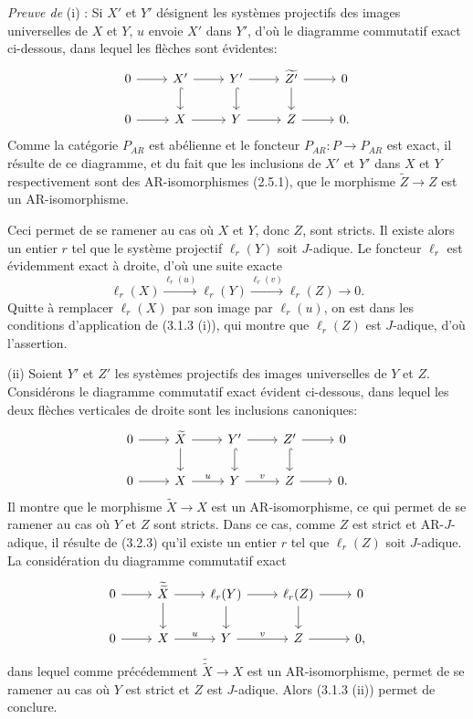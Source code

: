 \emph{Preuve de} (i) : Si $X'$ et $Y'$ désignent les systèmes projectifs des images universelles de $X$ et $Y$, $u$ envoie $X'$ dans $Y'$, d'où le diagramme commutatif exact ci-dessous, dans lequel les flèches sont évidentes:
\[
\begin{tikzcd}
0 \arrow[r] & X' \arrow[r] \arrow[d,hook] & Y' \arrow[r] \arrow[d,hook] & \widetilde{Z'} \arrow[r] \arrow[d] & 0\\
0 \arrow[r] & X \arrow[r] & Y \arrow[r] & Z \arrow[r] & 0 .
\end{tikzcd}
\]
Comme la catégorie $P_{AR}$ est abélienne et le foncteur 
$P_{AR}\colon P\to P_{AR}$ est
exact, il résulte de ce diagramme, et du fait que les inclusions de $X'$ et $Y'$ dans $X$ et $Y$ respectivement sont des AR-isomorphismes (2.5.1), que le morphisme $\widetilde Z\to Z$ est un AR-isomorphisme.

Ceci permet de se ramener au cas où $X$ et $Y$, donc $Z$, sont stricts. Il existe alors un entier $r$ tel que le système projectif $\ell_r(Y)$ soit $J$-adique. Le foncteur $\ell_r$ est évidemment exact à droite, d'où une suite exacte
\[
\ell_r(X)\stackrel{\ell_r(u)}{\longrightarrow}\ell_r(Y)\stackrel{\ell_r(v)}{\longrightarrow}\ell_r(Z)\longrightarrow0.
\]
Quitte à remplacer $\ell_r(X)$ par son image par $\ell_r(u)$, on est dans les conditions d'application de (3.1.3 (i)), qui montre que $\ell_r(Z)$ est $J$-adique, d'où l'assertion.

(ii) Soient $Y'$ et $Z'$ les systèmes projectifs des images universelles de $Y$ et $Z$. Considérons le diagramme commutatif exact évident ci-dessous, dans lequel les deux flèches verticales de droite sont les inclusions canoniques:
\[
\begin{tikzcd}
0 \arrow[r] & \widetilde X \arrow[r] \arrow[d] & Y' \arrow[r] \arrow[d,hook] & Z' \arrow[r] \arrow[d,hook] & 0\\
0 \arrow[r] & X \arrow[r,"u"] & Y \arrow[r,"v"] & Z \arrow[r] & 0 .
\end{tikzcd}
\]
Il montre que le morphisme $\widetilde X\to X$ est un AR-isomorphisme, ce qui permet de se ramener au cas où $Y$ et $Z$ sont stricts. Dans ce cas, comme $Z$ est strict et AR-$J$-adique, il résulte de (3.2.3) qu'il existe un entier $r$ tel que $\ell_r(Z)$ soit $J$-adique. La considération du diagramme commutatif exact
\[
\begin{tikzcd}
0 \arrow[r] & \widetilde{\widetilde X} \arrow[r] \arrow[d] & \ell_r(Y) \arrow[r] \arrow[d] & \ell_r(Z) \arrow[r] \arrow[d] & 0\\
0 \arrow[r] & X \arrow[r,"u"] & Y \arrow[r,"v"] & Z \arrow[r] & 0,
\end{tikzcd}
\]
dans lequel comme précédemment $\widetilde{\widetilde X}\to X$ est un AR-isomorphisme, permet de se ramener au cas où $Y$ est strict et  $Z$ est $J$-adique. Alors 
(3.1.3 (ii))
permet de conclure.

